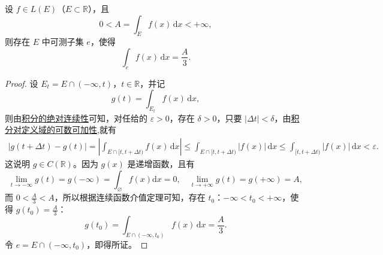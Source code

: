 \documentclass[../../main.tex]{subfiles}%
\begin{document}
\begin{corollary}
设 $f \in L(E)$（$E \subset \mathbb{R}$），且
\[
0 < A = \int_E f(x) \, \mathrm{d}x < +\infty,
\]
则存在 $E$ 中可测子集 $e$，使得
\[
\int_e f(x) \, \mathrm{d}x = \frac{A}{3}.
\]
\end{corollary}
\begin{proof}

设 $E_t = E \cap (-\infty, t)$，$t \in \mathbb{R}$，并记
\[
g(t) = \int_{E_t} f(x) \, \mathrm{d}x,
\]
则由\hyperref[theorem:积分的绝对连续性]{积分的绝对连续性}可知，对任给的 $\varepsilon > 0$，存在 $\delta > 0$，只要 $|\Delta t| < \delta$，由\hyperref[theorem:积分对定义域的可数可加性]{积分对定义域的可数可加性},就有
\begin{align*}
|g(t+\Delta t)-g(t)|=\left| \int_{E\cap [t,t+\Delta t)}{f\left( x \right) \,\mathrm{d}x} \right|\leqslant \int_{E\cap [t,t+\Delta t)}{|f(x)|\,\mathrm{d}x}\leqslant \int_{[t,t+\Delta t)}{|f(x)|\,\mathrm{d}x}<\varepsilon .
\end{align*}
这说明 $g \in C(\mathbb{R})$。因为 $g(x)$ 是递增函数，且有
\[
\lim_{t\rightarrow -\infty} g(t)=g\left( -\infty \right) =\int_{\varnothing}{f\left( x \right) \mathrm{d}x}=0,\quad \lim_{t\rightarrow +\infty} g(t)=g\left( +\infty \right) =A,
\]
而 $0 < \frac{A}{3} < A$，所以根据连续函数介值定理可知，存在 $t_0$：$-\infty < t_0 < +\infty$，使得 $g(t_0) = \frac{A}{3}$：
\[
g(t_0) = \int_{E \cap (-\infty, t_0)} f(x) \, \mathrm{d}x = \frac{A}{3}.
\]
令 $e = E \cap (-\infty, t_0)$，即得所证。

\end{proof}
\end{document}
